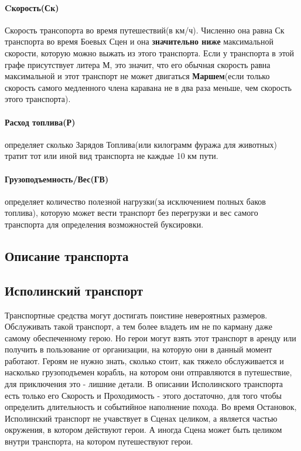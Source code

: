 \paragraph{Cкорость(Ск)} Скорость трансопорта во время путешествий(в км/ч). Численно она равна Ск транспорта во время Боевых Сцен и она \textbf{значительно ниже} максимальной скорости, которую можно выжать из этого транспорта. Если у транспорта в этой графе присутствует литера М, это значит, что его обычная скорость равна максимальной и этот транспорт не может двигаться \textbf{Маршем}(если только скорость самого медленного члена каравана не в два раза меньше, чем скорость этого транспорта).
\paragraph{Расход топлива(Р)} определяет сколько Зарядов Топлива(или килограмм фуража для животных) тратит тот или иной вид транспорта не каждые 10 км пути.
\paragraph{Грузоподъемность/Вес(ГВ)} определяет количество полезной нагрузки(за исключением полных баков топлива), которую может вести транспорт без перегрузки и вес самого транспорта для определения возможностей буксировки.

\subsection{Описание транспорта}

\subsection{Исполинский транспорт}
Транспортные средства могут достигать поистине невероятных размеров. Обслуживать такой транспорт, а тем более владеть им не по карману даже самому обеспеченному герою. Но герои могут взять этот транспорт в аренду или получить в пользование от организации, на которую они в данный момент работают.
\newline Героям не нужно знать, сколько стоит, как тяжело обслуживается и насколько грузоподъемен корабль, на котором они отправляются в путешествие, для приключения это - лишние детали. В описании Исполинского транспорта есть только его Скорость и Проходимость - этого достаточно, для того чтобы определить длительность и событийное наполнение похода.
\newline Во время Остановок, Исполинский транспорт не учавствует в Сценах целиком, а является частью окружения, в котором действуют герои. А иногда Сцена может быть целиком внутри транспорта, на котором путешествуют герои.
